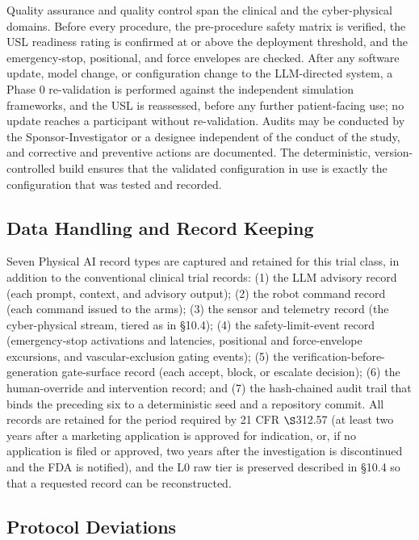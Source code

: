 Quality assurance and quality control span the clinical and the cyber-physical
domains. Before every procedure, the pre-procedure safety matrix is verified, the
USL readiness rating is confirmed at or above the deployment threshold, and the
emergency-stop, positional, and force envelopes are checked. After any software
update, model change, or configuration change to the LLM-directed system, a
Phase 0 re-validation is performed against the independent simulation frameworks,
and the USL is reassessed, before any further patient-facing use; no update reaches
a participant without re-validation. Audits may be conducted by the
Sponsor-Investigator or a designee independent of the conduct of the study, and
corrective and preventive actions are documented. The deterministic, version-controlled
build ensures that the validated configuration in use is exactly the configuration
that was tested and recorded.

\subsection{Data Handling and Record Keeping}

Seven Physical AI record types are captured and retained for this trial class, in
addition to the conventional clinical trial records: (1) the LLM advisory record
(each prompt, context, and advisory output); (2) the robot command record (each
command issued to the arms); (3) the sensor and telemetry record (the
cyber-physical stream, tiered as in \S10.4); (4) the safety-limit-event record
(emergency-stop activations and latencies, positional and force-envelope
excursions, and vascular-exclusion gating events); (5) the
verification-before-generation gate-surface record (each accept, block, or
escalate decision); (6) the human-override and intervention record; and (7) the
hash-chained audit trail that binds the preceding six to a deterministic seed and a
repository commit. All records are retained for the period required by 21 CFR
$\S$312.57 (at least two years after a marketing application is approved for
indication, or, if no application is filed or approved, two years after the
investigation is discontinued and the FDA is notified), and the L0 raw tier is
preserved described in \S10.4 so that a requested record can be reconstructed.

\subsection{Protocol Deviations}

